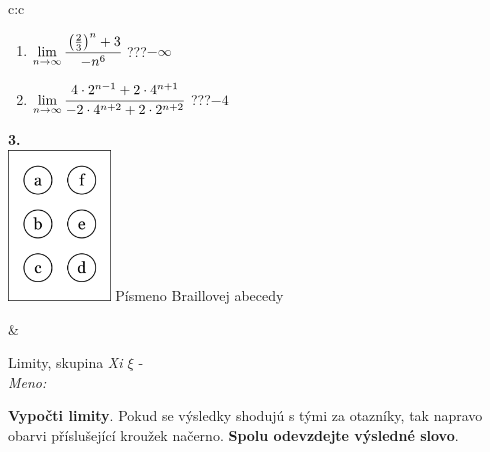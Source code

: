 \documentclass[10pt]{report}
\begin{document}
\begin{tabular}{c:c}
\begin{minipage}[c][104.5mm][t]{0.5\linewidth}
\begin{center}
\begin{minipage}{0.79\linewidth}
\begin{center}
\begin{varwidth}{\linewidth}
\begin{enumerate}
\item $\lim\limits_{n\to\infty}\cfrac{\left(\frac{2}{3}\right)^n +3}{-n^{6}}$\quad \dotfill\; ???\;\dotfill \quad $-\infty$
\item $\lim\limits_{n\to\infty}\cfrac{4\cdot 2^{n-1}+2\cdot 4^{n+1}}{-2\cdot 4^{n+2}+2\cdot 2^{n+2}}$\quad \dotfill\; ???\;\dotfill \quad $-4$
\end{enumerate}
\end{varwidth}
\end{center}
\end{minipage}
\begin{minipage}{0.20\linewidth}
\begin{center}
{\Huge\bfseries 3.} \\[2mm]
\includegraphics[height=40mm]{../images/braille.png}
{\small Písmeno Braillovej abecedy}
\end{center}
\end{minipage}
\end{center}
\end{minipage}
&
\begin{minipage}[c][104.5mm][t]{0.5\linewidth}
\begin{center}
\vspace{7mm}
{\huge Limity, skupina \textit{Xi $\xi$} -}\\[5mm]
\textit{Meno:}\phantom{xxxxxxxxxxxxxxxxxxxxxxxxxxxxxxxxxxxxxxxxxxxxxxxxxxxxxxxxxxxxxxxxx}\\[5mm]
\begin{minipage}{0.95\linewidth}
\begin{center}
\textbf{Vypočti limity}. Pokud se výsledky shodujú s tými za otazníky, tak napravo\\obarvi příslušející kroužek načerno. \textbf{Spolu odevzdejte výsledné slovo}.
\end{center}
\end{minipage}
\\[1mm]
\begin{minipage}{0.79\linewidth}
\begin{center}
\begin{varwidth}{\linewidth}

\end{varwidth}
\end{center}
\end{minipage}
\end{center}
\end{minipage}
\end{tabular}
\end{document}
